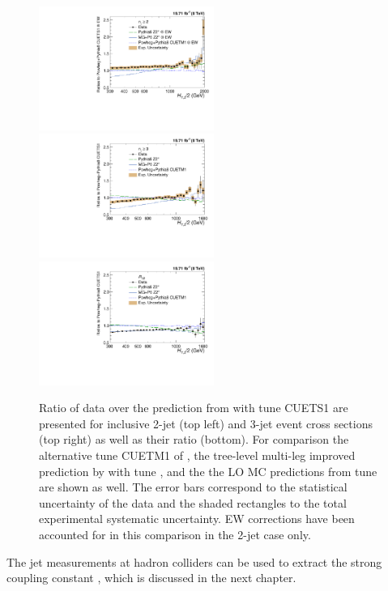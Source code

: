 \begin{figure}[!h]
 \begin{center}
 \hspace*{-5mm}\includegraphics[width=0.51\textwidth]{Plots_HT_2_150/Comparison_data_MC_samples_2_Pow_EW.pdf}%
 ~~\includegraphics[width=0.51\textwidth]{Plots_HT_2_150/Comparison_data_MC_samples_3_Pow.pdf}\\
 \includegraphics[width=0.51\textwidth]{Plots_HT_2_150/Comparison_data_MC_samples_ratio_32_Pow.pdf}\\
 \caption{Ratio of data over the prediction from \POWHEGn \plusn \PYTHIAE with tune CUETS1 are presented for inclusive 2-jet (top left) and 3-jet event cross sections (top right) as well as their ratio \ratio (bottom). For comparison the alternative tune CUETM1 of \POWHEGn \plusn \PYTHIAE, the tree-level multi-leg improved prediction by \MadGraphFn \plusn \PYTHIAS with tune \Ztwostar, and the the LO MC predictions from \PYTHIAS tune \Ztwostar are shown as well. The error bars correspond to the statistical uncertainty of the data and the shaded rectangles to the total experimental systematic uncertainty. EW corrections have been accounted for in this comparison in the 2-jet case only.}
 \label{fig:data_MC}
 \end{center}  
\end{figure}

The jet measurements at hadron colliders can be used to extract the strong coupling constant \alps, which is discussed in the next chapter.


